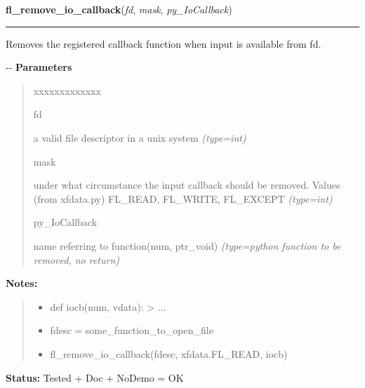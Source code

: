 \hspace{.8\funcindent}\begin{boxedminipage}{\funcwidth}

    \raggedright \textbf{fl\_remove\_io\_callback}(\textit{fd}, \textit{mask}, \textit{py\_IoCallback})

    \vspace{-1.5ex}

    \rule{\textwidth}{0.5\fboxrule}
\setlength{\parskip}{2ex}

Removes the registered callback function when input is available from
fd.

-{}-
\setlength{\parskip}{1ex}
      \textbf{Parameters}
      \vspace{-1ex}

      \begin{quote}
        \begin{Ventry}{xxxxxxxxxxxxx}

          \item[fd]


a valid file descriptor in a unix system
            {\it (type=int)}

          \item[mask]


under what circumstance the input callback should be removed. Values
(from xfdata.py) FL\_READ, FL\_WRITE, FL\_EXCEPT
            {\it (type=int)}

          \item[py\_IoCallback]


name referring to function(num, ptr\_void)
            {\it (type=python function to be removed, no return)}

        \end{Ventry}

      \end{quote}

\textbf{Notes:}
\begin{quote}
  \begin{itemize}

  \item
    \setlength{\parskip}{0.6ex}

def iocb(num, vdata): > ...


  \item 
fdesc = some\_function\_to\_open\_file


  \item 
fl\_remove\_io\_callback(fdesc, xfdata.FL\_READ, iocb)


\end{itemize}

\end{quote}

\textbf{Status:} 
Tested + Doc + NoDemo = OK


    \end{boxedminipage}

